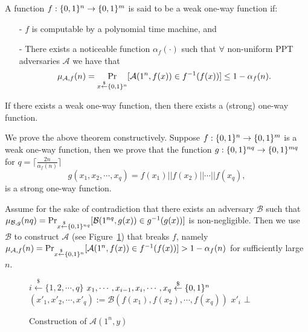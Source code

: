 \begin{tcolorbox}[colback=red!5!white]
\begin{definition}
A function $f : \{ 0, 1 \}^{n} \rightarrow \{ 0, 1 \}^{m}$ is said to be a weak one-way function if:
\begin{itemize}
\item[-] $f$ is computable by a polynomial time machine, and
\item[-] There exists a noticeable function $\alpha_f(\cdot)$ such that $\forall$ non-uniform PPT adversaries $\mathcal{A}$ we have that
    $$
    \mu_{\mathcal{A},f}(n) =
    \Pr_{x \stackrel{\$}{\leftarrow} \{ 0, 1 \}^{n}}[ \mathcal{A}(1^n, f(x)) \in f^{-1}(f(x))] \leq 1 - \alpha_{f}(n).
    $$
\end{itemize}
\end{definition}
\end{tcolorbox}
\begin{tcolorbox}[colback=green!5!white]
\begin{theorem}\label{theorem:weakstrongOWF}
If there exists a weak one-way function, then there exists a (strong) one-way function.
\end{theorem}
\end{tcolorbox}

\proof We prove the above theorem constructively. Suppose $f : \{ 0, 1 \}^{n} \rightarrow \{ 0, 1 \}^{m}$ is a weak one-way function, then we prove that the function $g: \{ 0, 1 \}^{nq} \rightarrow \{ 0, 1 \}^{mq}$ for $q = \lceil \frac{2n}{\alpha_{f}(n)} \rceil$
$$g(x_1, x_2, \cdots, x_q) = f(x_1) || f(x_2) || \cdots || f(x_q),$$
 is a strong one-way function.

Assume for the sake of contradiction that there exists an adversary $\mathcal{B}$ such that $\mu_{\mathcal{B},g}(nq) = \Pr_{x \stackrel{\$}{\leftarrow} \{ 0, 1 \}^{nq}}[ \mathcal{B}(1^{nq}, g(x)) \in g^{-1}(g(x))]$ is non-negligible.
Then we use $\mathcal{B}$ to construct $\mathcal{A}$ (see Figure~\ref{fig:adv:weak}) that breaks $f$, namely $\mu_{\mathcal{A},f}(n) = \Pr_{x \stackrel{\$}{\leftarrow} \{ 0, 1 \}^{n}}[ \mathcal{A}(1^n, f(x)) \in f^{-1}(f(x))] > 1 - \alpha_f(n)$ for sufficiently large $n$.
\begin{figure}[h]
\begin{algorithmic}[1]
    \State $i \stackrel{\$}{\leftarrow} \{1, 2, \cdots, q\}$
    \State $x_1, \cdots, x_{i-1}, x_i, \cdots, x_q \stackrel{\$}{\leftarrow} \{ 0, 1 \}^{n}$
    \State $(x'_1, x'_2, \cdots, x'_q) := \mathcal{B} (f(x_1), f(x_2), \cdots, f(x_q))$
    	\State \Return $x'_i$
    \EndIf
\EndLoop
\State \Return $\bot$
\end{algorithmic}
\caption{Construction of $\mathcal{A}(1^n, y)$}
\label{fig:adv:weak}
\end{figure}

